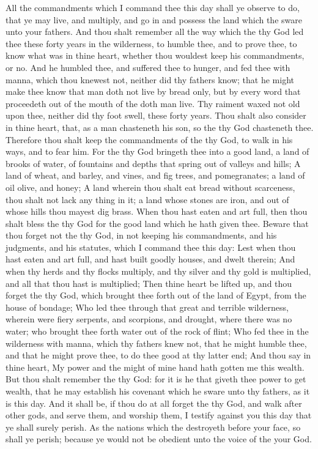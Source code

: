 \begin{biblechapter} %
 All the commandments which I command thee this day shall ye observe to do, that ye may live, and multiply, and go in and possess the land which the \LORD sware unto your fathers.
\verse And thou shalt remember all the way which the \LORD thy God led thee these forty years in the wilderness, to humble thee, and to prove thee, to know what was in thine heart, whether thou wouldest keep his commandments, or no.
\verse And he humbled thee, and suffered thee to hunger, and fed thee with manna, which thou knewest not, neither did thy fathers know; that he might make thee know that man doth not live by bread only, but by every word that proceedeth out of the mouth of the \LORD doth man live.
\verse Thy raiment waxed not old upon thee, neither did thy foot swell, these forty years.
\verse Thou shalt also consider in thine heart, that, as a man chasteneth his son, so the \LORD thy God chasteneth thee.
\verse Therefore thou shalt keep the commandments of the \LORD thy God, to walk in his ways, and to fear him.
\verse For the \LORD thy God bringeth thee into a good land, a land of brooks of water, of fountains and depths that spring out of valleys and hills;
\verse A land of wheat, and barley, and vines, and fig trees, and pomegranates; a land of oil olive, and honey;
\verse A land wherein thou shalt eat bread without scarceness, thou shalt not lack any thing in it; a land whose stones are iron, and out of whose hills thou mayest dig brass.
\verse When thou hast eaten and art full, then thou shalt bless the \LORD thy God for the good land which he hath given thee.
\verse Beware that thou forget not the \LORD thy God, in not keeping his commandments, and his judgments, and his statutes, which I command thee this day:
\verse Lest when thou hast eaten and art full, and hast built goodly houses, and dwelt therein;
\verse And when thy herds and thy flocks multiply, and thy silver and thy gold is multiplied, and all that thou hast is multiplied;
\verse Then thine heart be lifted up, and thou forget the \LORD thy God, which brought thee forth out of the land of Egypt, from the house of bondage;
\verse Who led thee through that great and terrible wilderness, wherein were fiery serpents, and scorpions, and drought, where there was no water; who brought thee forth water out of the rock of flint;
\verse Who fed thee in the wilderness with manna, which thy fathers knew not, that he might humble thee, and that he might prove thee, to do thee good at thy latter end;
\verse And thou say in thine heart, My power and the might of mine hand hath gotten me this wealth.
\verse But thou shalt remember the \LORD thy God: for it is he that giveth thee power to get wealth, that he may establish his covenant which he sware unto thy fathers, as it is this day.
\verse And it shall be, if thou do at all forget the \LORD thy God, and walk after other gods, and serve them, and worship them, I testify against you this day that ye shall surely perish.
\verse As the nations which the \LORD destroyeth before your face, so shall ye perish; because ye would not be obedient unto the voice of the \LORD your God.
\end{biblechapter}

